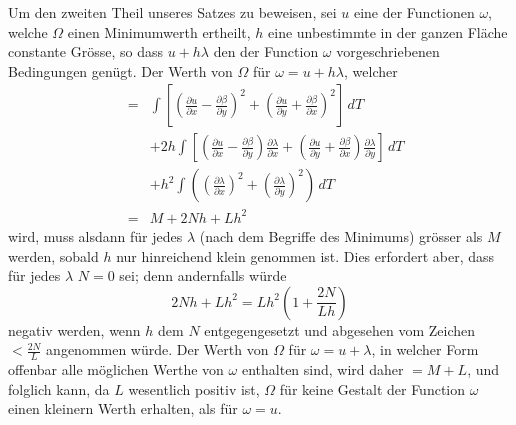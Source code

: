 \documentclass[a4paper,12pt]{article}
\begin{document}
Um den zweiten Theil unseres Satzes zu beweisen, sei $u$ eine der
Functionen $\omega$, welche $\Omega$ einen Minimumwerth ertheilt,
$h$ eine unbestimmte in der ganzen Fl\"{a}che constante
Gr\"{o}sse, so dass $u + h \lambda$ den der Function $\omega$
vorgeschriebenen Bedingungen gen\"{u}gt.  Der Werth von $\Omega$
f\"{u}r $\omega = u + h \lambda$, welcher
\begin{eqnarray*}
   &=& \int
      \left[
         \left(
            \frac{\partial u     }{\partial x}
          - \frac{\partial \beta }{\partial y}
         \right)^2
       + \left(
            \frac{\partial u     }{\partial y}
          + \frac{\partial \beta }{\partial x}
         \right)^2
      \right] \, dT \\
   & &+ 2 h \int
      \left[
         \left(
            \frac{\partial u     }{\partial x}
          - \frac{\partial \beta }{\partial y}
         \right) \frac{\partial \lambda}{\partial x}
       + \left(
            \frac{\partial u     }{\partial y}
          + \frac{\partial \beta }{\partial x}
         \right) \frac{\partial \lambda}{\partial y}
      \right] \, dT \\
   & &+ h^2 \int
      \left(
         \left( \frac{\partial \lambda}{\partial x} \right)^2
       + \left( \frac{\partial \lambda}{\partial y} \right)^2
      \right) \, dT \\
   &=& M + 2 N h + L h^2
\end{eqnarray*}
wird, muss alsdann f\"{u}r jedes $\lambda$ (nach dem Begriffe des
Minimums) gr\"{o}sser als $M$ werden, sobald $h$ nur hinreichend
klein genommen ist.  Dies erfordert aber, dass f\"{u}r jedes
$\lambda$ $N = 0$ sei; denn andernfalls w\"{u}rde
\[ 2 N h + L h^2 = L h^2 \left( 1 + \frac{2N}{Lh} \right) \]
negativ werden, wenn $h$ dem $N$ entgegengesetzt und abgesehen
vom Zeichen
$\displaystyle < \frac{2N}{L}$
angenommen w\"{u}rde.  Der Werth von $\Omega$ f\"{u}r
$\omega = u + \lambda$, in welcher Form offenbar alle
m\"{o}glichen Werthe von $\omega$ enthalten sind, wird daher
$= M + L$, und folglich kann, da $L$ wesentlich positiv ist,
$\Omega$ f\"{u}r keine Gestalt der Function $\omega$ einen
kleinern Werth erhalten, als f\"{u}r $\omega = u$.
\end{document}
